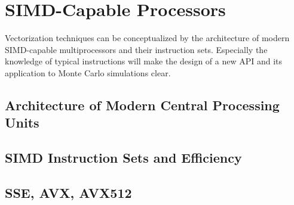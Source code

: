 \documentclass{stdlocal}
\begin{document}
  \section{SIMD-Capable Processors} %
  \label{sub:simd-capable_processors}
    Vectorization techniques can be conceptualized by the architecture of modern SIMD-capable multiprocessors and their instruction sets.
    Especially the knowledge of typical instructions will make the design of a new API and its application to Monte Carlo simulations clear.

    \subsection{Architecture of Modern Central Processing Units} %
    \label{ssub:architecture_of_modern_central_processing_units}


    \subsection{SIMD Instruction Sets and Efficiency} %
    \label{ssub:simd_instruction_sets_and_efficiency}


    \subsection{SSE, AVX, AVX512} %
    \label{ssub:sse_avx_avx512}

\end{document}
